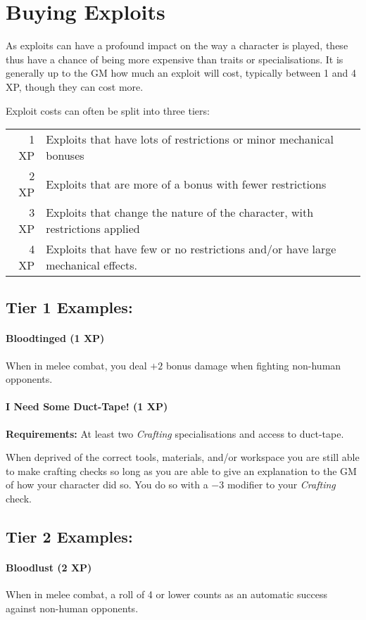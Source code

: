 \section{Buying Exploits}
As exploits can have a profound impact on the way a character is played, these thus have a chance of being more expensive than traits or specialisations.
It is generally up to the GM how much an exploit will cost, typically between 1 and 4 XP, though they can cost more.

Exploit costs can often be split into three tiers:

\begin{tabular}{r | l}
  1 XP & Exploits that have lots of restrictions or minor mechanical bonuses\\
  2 XP & Exploits that are more of a bonus with fewer restrictions\\
  3 XP & Exploits that change the nature of the character, with restrictions applied\\
  4 XP & Exploits that have few or no restrictions and/or have large mechanical effects.
\end{tabular}

\subsection{Tier 1 Examples:}
\paragraph{Bloodtinged (1 XP)}
When in melee combat, you deal $+2$ bonus damage when fighting non-human opponents.

\paragraph{I Need Some Duct-Tape! (1 XP)}
\textbf{Requirements:} At least two \textit{Crafting} specialisations and access to duct-tape.

When deprived of the correct tools, materials, and/or workspace you are still able to make crafting checks so long as you are able to give an explanation to the GM of how your character did so.
You do so with a $-3$ modifier to your \textit{Crafting} check.

\subsection{Tier 2 Examples:}
\paragraph{Bloodlust (2 XP)}
When in melee combat, a roll of 4 or lower counts as an automatic success against non-human opponents.

